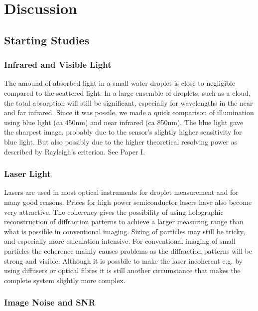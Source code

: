 
\chapter{Discussion}
\label{chap:discussion}



\section{Starting Studies}



\subsection{Infrared and Visible Light}

The amound of absorbed light in a small water droplet is close to negligible compared to the scattered light. In a large ensemble of droplets, such as a cloud, the total absorption will still be significant, especially for wavelengths in the near and far infrared. Since it was possile, we made a quick comparison of illumination using blue light (ca 450nm) and near infrared (ca 850nm). The blue light gave the sharpest image, probably due to the sensor's slightly higher sensitivity for blue light. But also possibly due to the higher theoretical resolving power as described by Rayleigh's criterion. See Paper I.

\subsection{Laser Light}

Lasers are used in most optical instruments for droplet measurement and for many good reasons. Prices for high power semiconductor lasers have also become very attractive. The coherency gives the possibility of using holographic reconstruction of diffraction patterns to achieve a larger measuring range than what is possible in conventional imaging. Sizing of particles may still be tricky, and especially more calculation intensive. For conventional imaging of small particles the coherence mainly causes problems as the diffraction patterns will be strong and visible. Although it is possbile to make the laser incoherent e.g. by using diffusers or optical fibres it is still another circumstance that makes the complete system slightly more complex.

\subsection{Image Noise and SNR}

